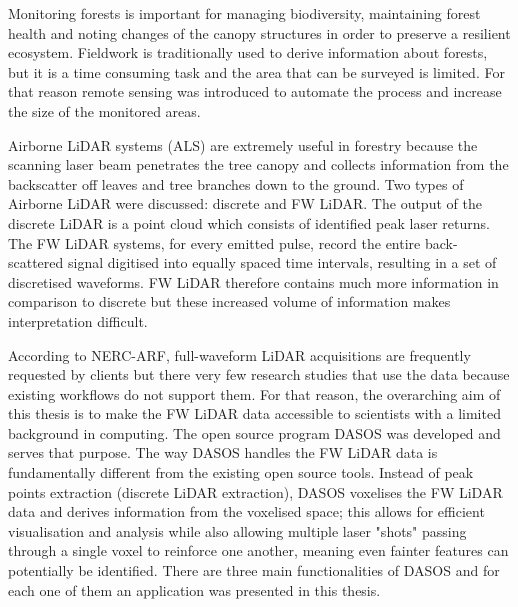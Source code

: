 \documentclass{subfiles}
\begin{document}
\par Monitoring forests is important for managing biodiversity, maintaining forest health and noting changes of the canopy structures in order to preserve a resilient ecosystem.  Fieldwork is traditionally used to derive information about forests, but it is a time consuming task and the area that can be surveyed is limited.  For that reason remote sensing was introduced to automate the process and increase the size of the monitored areas. 

\par Airborne LiDAR systems (ALS) are extremely useful in forestry because the scanning laser beam penetrates the tree canopy and collects information from the backscatter off leaves and tree branches down to the ground. Two types of Airborne LiDAR were discussed: discrete and FW LiDAR. The output of the discrete LiDAR is a point cloud which consists of identified peak laser returns. The FW LiDAR systems, for every emitted pulse, record the entire back-scattered signal digitised into equally spaced time intervals, resulting in a set of discretised waveforms. FW LiDAR therefore contains much more information in comparison to discrete but these increased volume of information makes interpretation difficult. 

\par According to NERC-ARF, full-waveform LiDAR acquisitions are frequently requested by clients but there very few research studies that use the data because existing workflows do not support them. For that reason, the overarching aim of this thesis is to make the FW LiDAR data accessible to scientists with a limited background in computing. The open source program DASOS was developed and serves that purpose. The way DASOS handles the FW LiDAR data is fundamentally different from the existing open source tools. Instead of peak points extraction (discrete LiDAR extraction), DASOS voxelises the FW LiDAR data and derives information from the voxelised space; this allows for efficient visualisation and analysis while also allowing multiple laser "shots" passing through a single voxel to reinforce one another, meaning even fainter features can potentially be identified. There are three main functionalities of DASOS and for each one of them an application was presented in this thesis.  
\end{document}
